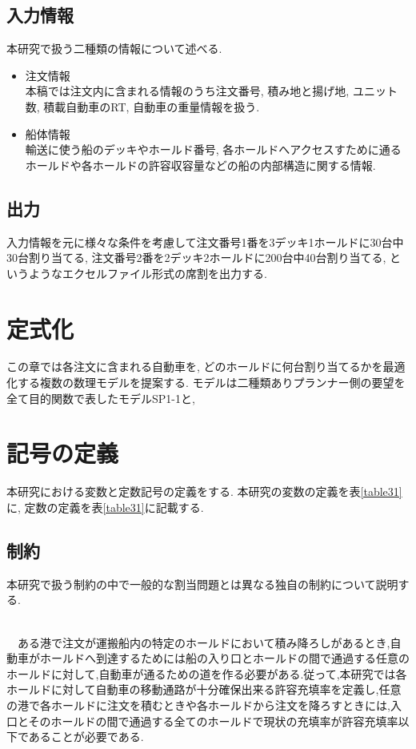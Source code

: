 \documentclass[a4j,11pt,twocolumn]{jsarticle}
\begin{document}
\subsection{入力情報}
本研究で扱う二種類の情報について述べる.
\begin{itemize}

\item 注文情報 \\
本稿では注文内に含まれる情報のうち注文番号, 積み地と揚げ地, ユニット数, 積載自動車のRT, 自動車の重量情報を扱う.

\item 船体情報 \\
輸送に使う船のデッキやホールド番号, 各ホールドへアクセスすために通るホールドや各ホールドの許容収容量などの船の内部構造に関する情報.

\end{itemize}

\subsection{出力}
入力情報を元に様々な条件を考慮して注文番号1番を3デッキ1ホールドに30台中30台割り当てる, 注文番号2番を2デッキ2ホールドに200台中40台割り当てる, というようなエクセルファイル形式の席割を出力する.


\section{定式化}
この章では各注文に含まれる自動車を, どのホールドに何台割り当てるかを最適化する複数の数理モデルを提案する. モデルは二種類ありプランナー側の要望を全て目的関数で表したモデルSP1-1と,
\section{記号の定義}
本研究における変数と定数記号の定義をする. 本研究の変数の定義を表\ref{table31}に, 定数の定義を表\ref{table31}に記載する. \\

\subsection{制約}
本研究で扱う制約の中で一般的な割当問題とは異なる独自の制約について説明する.

 \\
　ある港で注文が運搬船内の特定のホールドにおいて積み降ろしがあるとき,自動車がホールドへ到達するためには船の入り口とホールドの間で通過する任意のホールドに対して,自動車が通るための道を作る必要がある.従って,本研究では各ホールドに対して自動車の移動通路が十分確保出来る許容充填率を定義し,任意の港で各ホールドに注文を積むときや各ホールドから注文を降ろすときには,入口とそのホールドの間で通過する全てのホールドで現状の充填率が許容充填率以下であることが必要である.
\end{document}
